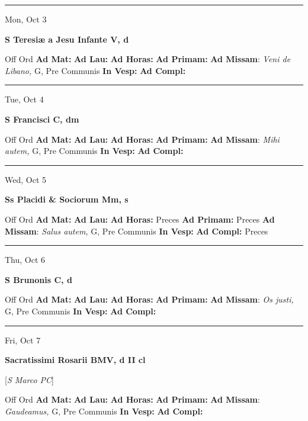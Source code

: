 \documentclass[letterpaper, 10pt]{article}
\begin{document}
\hrule
\begin{center}
Mon, Oct 3
\end{center}\textbf{ \large S Teresiæ a Jesu Infante V, \textnormal{\normalsize d}}
\begin{justify}
Off Ord
\textbf{Ad Mat: }
\textbf{Ad Lau: }
\textbf{Ad Horas: }
\textbf{Ad Primam: }
\textbf{Ad Missam}: \textit{Veni de Libano,} G, Pre Communis
\textbf{In Vesp: }
\textbf{Ad Compl: }\end{justify}



\hrule
\begin{center}
Tue, Oct 4
\end{center}\textbf{ \large S Francisci C, \textnormal{\normalsize dm}}
\begin{justify}
Off Ord
\textbf{Ad Mat: }
\textbf{Ad Lau: }
\textbf{Ad Horas: }
\textbf{Ad Primam: }
\textbf{Ad Missam}: \textit{Mihi autem,} G, Pre Communis
\textbf{In Vesp: }
\textbf{Ad Compl: }\end{justify}



\hrule
\begin{center}
Wed, Oct 5
\end{center}\textbf{ \large Ss Placidi \& Sociorum Mm, \textnormal{\normalsize s}}
\begin{justify}
Off Ord
\textbf{Ad Mat: }
\textbf{Ad Lau: }
\textbf{Ad Horas: }Preces
\textbf{Ad Primam: }Preces
\textbf{Ad Missam}: \textit{Salus autem,} G, Pre Communis
\textbf{In Vesp: }
\textbf{Ad Compl: }Preces\end{justify}



\hrule
\begin{center}
Thu, Oct 6
\end{center}\textbf{ \large S Brunonis C, \textnormal{\normalsize d}}
\begin{justify}
Off Ord
\textbf{Ad Mat: }
\textbf{Ad Lau: }
\textbf{Ad Horas: }
\textbf{Ad Primam: }
\textbf{Ad Missam}: \textit{Os justi,} G, Pre Communis
\textbf{In Vesp: }
\textbf{Ad Compl: }\end{justify}



\hrule
\begin{center}
Fri, Oct 7
\end{center}\textbf{ \large Sacratissimi Rosarii BMV, \textnormal{\normalsize d II cl}}

[\textit{S Marco PC}]
\begin{justify}
Off Ord
\textbf{Ad Mat: }
\textbf{Ad Lau: }
\textbf{Ad Horas: }
\textbf{Ad Primam: }
\textbf{Ad Missam}: \textit{Gaudeamus,} G, Pre Communis
\textbf{In Vesp: }
\textbf{Ad Compl: }\end{justify}
\end{document}
